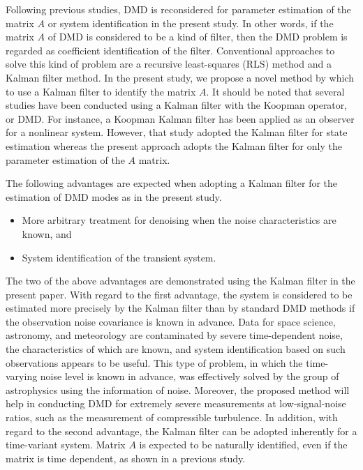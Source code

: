 \documentclass[aip,graphicx]{revtex4-1}
\begin{document}
Following previous studies, DMD is reconsidered for parameter estimation of the matrix $A$ or system identification in the present study. In other words, if the matrix $A$ of DMD is considered to be a kind of filter, then the DMD problem is regarded as coefficient identification of the filter. Conventional approaches to solve this kind of problem are a recursive least-squares (RLS) method and a Kalman filter method.\cite{Kalman1960}
In the present study, we propose a novel method by which to use a Kalman filter to identify the matrix $A$. It should be noted that several studies have been conducted using a Kalman filter with the Koopman operator, or DMD. For instance, a Koopman Kalman filter has been applied as an observer for a nonlinear system.\cite{Surana2016,Surana2017} However, that study adopted the Kalman filter for state estimation whereas the present approach adopts the Kalman filter for only the parameter estimation of the $A$ matrix. 

The following advantages are expected when adopting a Kalman filter for the estimation of DMD modes as in the present study. 
\begin{itemize}
    \item More arbitrary treatment for denoising when the noise characteristics are known, and
    \item System identification of the transient system.
\end{itemize}
The two of the above advantages are demonstrated using the Kalman filter in the present paper. 
With regard to the first advantage, the system is considered to be estimated more precisely by the Kalman filter than by standard DMD methods if the observation noise covariance is known in advance. Data for space science, astronomy, and meteorology are contaminated by severe time-dependent noise, the characteristics of which are known, and system identification based on such observations appears to be useful. This type of problem, in which the time-varying noise level is known in advance, was effectively solved by the group of astrophysics using the information of noise.\cite{Bailey2012} Moreover, the proposed method will help in conducting DMD for extremely severe measurements at low-signal-noise ratios, such as the measurement of compressible turbulence. In addition, with regard to the second advantage, the Kalman filter can be adopted inherently for a time-variant system. Matrix $A$ is expected to be naturally identified, even if the matrix is time dependent, as shown in a previous study.\cite{Zhang2017}  
\end{document}
